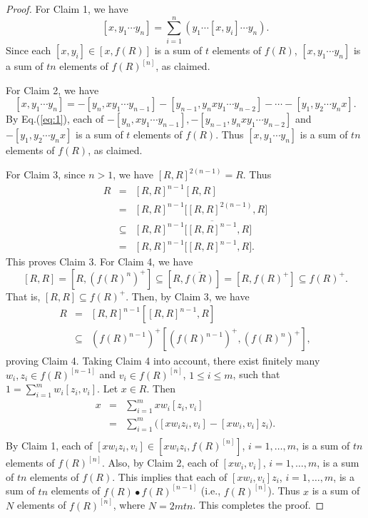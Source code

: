 \documentclass[11pt]{article}
\theoremstyle{definition}
\begin{document}
{{{{\begin{proof}
					For Claim 1, we have
					$$
					[x, y_1\cdots y_n]=\sum_{i=1}^n( y_1\cdots[x, y_i]\cdots y_n).
					$$
					Since each $[x, y_i]\in [x, f(R)]$ is a sum of $t$ elements of $f(R)$, $[x, y_1\cdots y_n]$ is a sum of $tn$ elements of $f(R)^{[n]}$, as claimed.
					
					For Claim 2, we have
					$$
					[x, y_1\cdots y_n]=-[y_n, xy_1\cdots y_{n-1}]-[ y_{n-1}, y_nxy_1\cdots y_{n-2}]-\cdots-[ y_1, y_2\cdots y_nx].
					$$
					By Eq.(\ref{eq:1}), each of $-[y_n, xy_1\cdots y_{n-1}], -[ y_{n-1}, y_nxy_1\cdots y_{n-2}]$ and $-[ y_1, y_2\cdots y_nx]$ is a sum of $t$ elements of $f(R)$.
					Thus $[x, y_1\cdots y_n]$ is a sum of $tn$ elements of $f(R)$, as claimed.
					
					For Claim 3, since $n>1$, we have $[R, R]^{2(n-1)}=R$. Thus
					\begin{eqnarray*}
						R&=&[R, R]^{n-1}[R, R]\\
						&=&[R, R]^{n-1}\big[[R, R]^{2(n-1)}, R\big]\\
						&\subseteq& [R, R]^{n-1}\big[\overline {[R, R]^{n-1}}, R]\\
						&=& [R, R]^{n-1}\big[[R, R]^{n-1}, R].
					\end{eqnarray*}
					This proves Claim 3.
					For Claim 4, we have
					$$
					[R, R]=[R, (f(R)^n)^+]\subseteq [R, \overline{f(R)}]=[R, f(R)^+]\subseteq f(R)^+.
					$$
					That is, $[R, R]\subseteq f(R)^+$. Then, by Claim 3, we have
					\begin{eqnarray*}
						R&=& [R, R]^{n-1}[[R, R]^{n-1}, R] \\
						& \subseteq & (f(R)^{n-1})^+[(f(R)^{n-1})^+, (f(R)^n)^+],
					\end{eqnarray*}
					proving Claim 4. Taking Claim 4 into account, there exist finitely many $w_i, z_i\in f(R)^{[n-1]}$ and $v_i\in f(R)^{[n]}$, $1\leq i\leq m$, such that
					$
					1 = \sum_{i=1}^mw_i[z_i, v_i].
					$
					Let $x\in R$. Then
					\begin{eqnarray*}
						x &=& \sum_{i=1}^mxw_i[z_i, v_i] \\
						&=& \sum_{i=1}^m\big([xw_iz_i, v_i] - [xw_i, v_i]z_i ). \\
					\end{eqnarray*}
					By Claim 1, each of $[xw_iz_i, v_i]\in [xw_iz_i, f(R)^{[n]}]$, $i=1,\ldots,m$, is a sum of $tn$ elements of $f(R)^{[n]}$. Also,  by Claim 2, each of $ [xw_i, v_i]$, $i=1,\ldots,m$, is a sum of $tn$ elements of $f(R)$. This implies that each of $ [xw_i, v_i]z_i$, $i=1,\ldots,m$, is a sum of $tn$ elements of $f(R)\bullet f(R)^{[n-1]}$ (i.e., $f(R)^{[n]}$).
					Thus $x$ is a sum of $N$ elements of $f(R)^{[n]}$, where $N=2mtn$.
					This completes the proof.
				\end{proof}
				
}}}}
\end{document}
